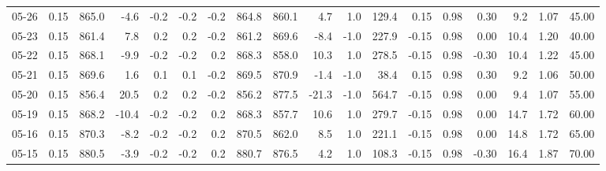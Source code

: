 \begin{threeparttable}
{\begin{tabular}{lrrrrrrrrrrrrrrrrr}
  05-26 &     0.15 & 865.0 &              -4.6 &              -0.2 &               -0.2 &               -0.2 & 864.8 & 860.1 &        4.7 &                      1.0 &               129.4 &       0.15 &      0.98 &           0.30 &              9.2 &            1.07 &                  45.00 \\
  05-23 &     0.15 & 861.4 &               7.8 &               0.2 &                0.2 &               -0.2 & 861.2 & 869.6 &       -8.4 &                     -1.0 &               227.9 &      -0.15 &      0.98 &           0.00 &             10.4 &            1.20 &                  40.00 \\
  05-22 &     0.15 & 868.1 &              -9.9 &              -0.2 &               -0.2 &                0.2 & 868.3 & 858.0 &       10.3 &                      1.0 &               278.5 &      -0.15 &      0.98 &          -0.30 &             10.4 &            1.22 &                  45.00 \\
  05-21 &     0.15 & 869.6 &               1.6 &               0.1 &                0.1 &               -0.2 & 869.5 & 870.9 &       -1.4 &                     -1.0 &                38.4 &       0.15 &      0.98 &           0.30 &              9.2 &            1.06 &                  50.00 \\
  05-20 &     0.15 & 856.4 &              20.5 &               0.2 &                0.2 &               -0.2 & 856.2 & 877.5 &      -21.3 &                     -1.0 &               564.7 &      -0.15 &      0.98 &           0.00 &              9.4 &            1.07 &                  55.00 \\
  05-19 &     0.15 & 868.2 &             -10.4 &              -0.2 &               -0.2 &                0.2 & 868.3 & 857.7 &       10.6 &                      1.0 &               279.7 &      -0.15 &      0.98 &           0.00 &             14.7 &            1.72 &                  60.00 \\
  05-16 &     0.15 & 870.3 &              -8.2 &              -0.2 &               -0.2 &                0.2 & 870.5 & 862.0 &        8.5 &                      1.0 &               221.1 &      -0.15 &      0.98 &           0.00 &             14.8 &            1.72 &                  65.00 \\
  05-15 &     0.15 & 880.5 &              -3.9 &              -0.2 &               -0.2 &                0.2 & 880.7 & 876.5 &        4.2 &                      1.0 &               108.3 &      -0.15 &      0.98 &          -0.30 &             16.4 &            1.87 &                  70.00 \\

\end{tabular}}
\end{threeparttable}
